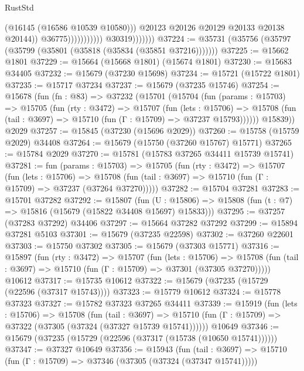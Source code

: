 \begin{lexlean}{RustStd}
\begin{coremodule}
                                              (@16145 (@16586 @10539 @10580)))
                                            @20123
                                            @20126
                                            @20129
                                            @20133
                                            @20138
                                            @20144))
                                        @36775)))))))))))
                  @30319)))))))
@37224 := @35731 (@35756 (@35797 (@35799 (@35801 (@35818 (@35834 (@35851 @37216)))))))
@37225 := @15662 @1801
@37229 := @15664 (@15668 @1801) (@15674 @1801)
@37230 := @15683 @34405
@37232 := @15679 (@37230 @15698)
@37234 := @15721 (@15722 @1801)
@37235 := @15717 @37234
@37237 := @15679 (@37235 @15746)
@37254 := @15678
    (fun (fn : @83) =>
    @37232
      (@15701
        (@15704
          (fun (params : @15703) =>
          @15705
            (fun (rty : @3472) =>
            @15707
              (fun (lets : @15706) =>
              @15708 (fun (tail : @3697) => @15710 (fun (Γ : @15709) => @37237 @15793))))))
        @15839))
    @2029
@37257 := @15845 (@37230 (@15696 @2029))
@37260 := @15758 (@15759 @2029) @34408
@37264 := @15679 (@15750 (@37260 @15767) @15771)
@37265 := @15784 @2029
@37270 := @15781 (@15783 @37265 @34411 @15739 @15741)
@37281 := fun (params : @15703) =>
  @15705
    (fun (rty : @3472) =>
    @15707
      (fun (lets : @15706) =>
      @15708 (fun (tail : @3697) => @15710 (fun (Γ : @15709) => @37237 (@37264 @37270)))))
@37282 := @15704 @37281
@37283 := @15701 @37282
@37292 := @15807
    (fun (U : @15806) => @15808 (fun (t : @7) => @15816 (@15679 (@15822 @34408 @15697) @15833)))
@37295 := @37257 (@37283 @37292) @34406
@37297 := @15664 @37282 @37292
@37299 := @15894 @37281 @5103
@37301 := @15679 (@37235 @22598)
@37302 := @37260 @22601
@37303 := @15750 @37302
@37305 := @15679 (@37303 @15771)
@37316 := @15897
    (fun (rty : @3472) =>
    @15707
      (fun (lets : @15706) =>
      @15708 (fun (tail : @3697) => @15710 (fun (Γ : @15709) => @37301 (@37305 @37270)))))
    @10612
@37317 := @15735 @10612
@37322 := @15679 (@37235 (@15729 (@22596 (@37317 @15743))))
@37323 := @15779 @10612
@37324 := @15778 @37323
@37327 := @15782 @37323 @37265 @34411
@37339 := @15919
    (fun (lets : @15706) =>
    @15708
      (fun (tail : @3697) =>
      @15710 (fun (Γ : @15709) => @37322 (@37305 (@37324 (@37327 @15739 @15741))))))
    @10649
@37346 := @15679 (@37235 (@15729 (@22596 (@37317 (@15738 (@10650 @15741))))))
@37347 := @37327 @10649
@37356 := @15943
    (fun (tail : @3697) => @15710 (fun (Γ : @15709) => @37346 (@37305 (@37324 (@37347 @15741)))))

\end{coremodule}
\end{lexlean}

